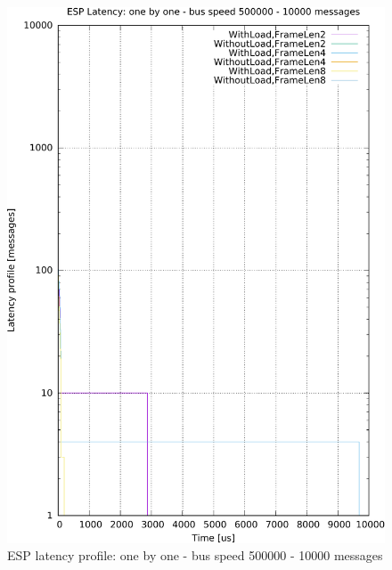 \documentclass{ctuthesis}
\begin{document}
\begin{figure}[htb]
\includegraphics[width=\linewidth]{figures/speed500000_messages10000_floodFalse.pdf}
\caption{ESP latency profile: one by one - bus speed 500000 - 10000 messages}
\end{figure}
\end{document}
